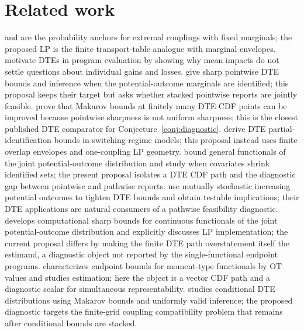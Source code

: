 \documentclass[11pt]{article}
\theoremstyle{definition}
\theoremstyle{plain}
\theoremstyle{remark}
\begin{document}
\section{Related work}
\citet{Makarov1981} and \citet{Rueschendorf1982} are the probability anchors for
extremal couplings with fixed marginals; the proposed LP is the finite
transport-table analogue with marginal envelopes.  \citet{HeckmanSmithClements1997}
motivate DTEs in program evaluation by showing why mean impacts do not settle
questions about individual gains and losses.  \citet[Section 2 and Lemma
2.3]{FanPark2010} give sharp pointwise DTE bounds and inference when the
potential-outcome marginals are identified; this proposal keeps their target but
asks whether stacked pointwise reports are jointly feasible.  \citet[Section
2]{FirpoRidder2019} prove that Makarov bounds at finitely many DTE CDF points can
be improved because pointwise sharpness is not uniform sharpness; this is the
closest published DTE comparator for Conjecture~\ref{conj:diagnostic}.
\citet[Sections 2--3]{FanWu2010} derive DTE partial-identification bounds in
switching-regime models; this proposal instead uses finite overlap envelopes and
one-coupling LP geometry.  \citet[Sections 2--3]{FanGuerreZhu2017} bound general
functionals of the joint potential-outcome distribution and study when covariates
shrink identified sets; the present proposal isolates a DTE CDF path and the
diagnostic gap between pointwise and pathwise reports.  \citet{FrandsenLefgren2021}
use mutually stochastic increasing potential outcomes to tighten DTE bounds and
obtain testable implications; their DTE applications are natural consumers of a
pathwise feasibility diagnostic.  \citet[Supplementary Appendix 3]{Russell2021}
develops computational sharp bounds for continuous functionals of the joint
potential-outcome distribution and explicitly discusses LP implementation; the
current proposal differs by making the finite DTE path overstatement itself the
estimand, a diagnostic object not reported by the single-functional endpoint
programs.  \citet[Sections 2--3]{OberReynolds2023} characterizes endpoint bounds
for moment-type functionals by OT values and studies estimation; here the object
is a vector CDF path and a diagnostic scalar for simultaneous representability.
\citet[Sections 2--3]{Lee2024}
studies conditional DTE distributions using Makarov bounds and uniformly valid
inference; the proposed diagnostic targets the finite-grid coupling compatibility
problem that remains after conditional bounds are stacked.
\end{document}
